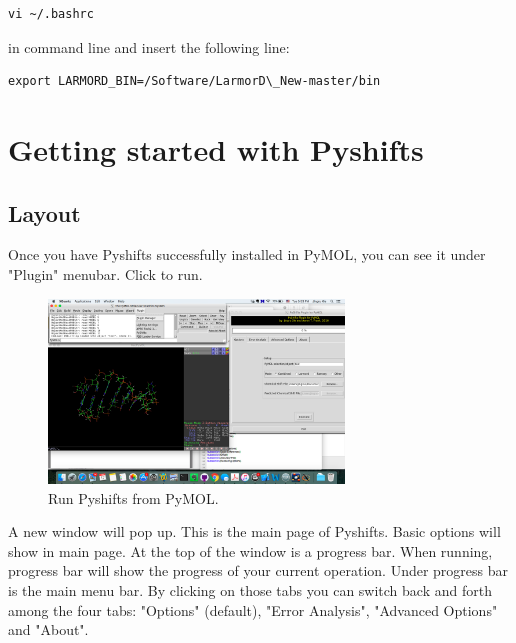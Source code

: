 \documentclass{article}
\begin{document}
\begin{enumerate}
\begin{lstlisting}
vi ~/.bashrc
\end{lstlisting}

in command line and insert the following line: 

\begin{lstlisting}
export LARMORD_BIN=/Software/LarmorD\_New-master/bin
\end{lstlisting}



\end{enumerate}



\newpage
\section{Getting started with Pyshifts}

\subsection{Layout}

Once you have Pyshifts successfully installed in PyMOL, you can see it under "Plugin" menubar. Click to run.

\begin{figure}[htbp]
\centering
\includegraphics[width=0.7\textwidth]{layout_0.png}
\caption{Run Pyshifts from PyMOL.}
\label{fig:layout0}
\end{figure}


A new window will pop up. This is the main page of Pyshifts. Basic options will show in main page. At the top of the window is a progress bar. When running, progress bar will show the progress of your current operation. Under progress bar is the main menu bar. By clicking on those tabs you can switch back and forth among the four tabs: "Options" (default), "Error Analysis", "Advanced Options" and "About".
\end{document}
